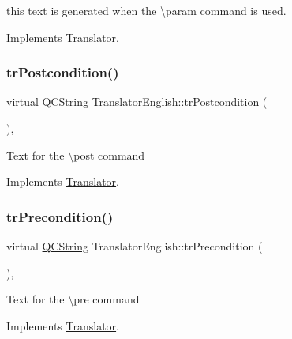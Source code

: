 this text is generated when the \textbackslash{}param command is used. 

Implements \mbox{\hyperlink{class_translator}{Translator}}.

\mbox{\label{class_translator_english_ab86ae8b2c4996172bc1138cdd0ccf7e2}} 
\subsubsection{\texorpdfstring{trPostcondition()}{trPostcondition()}}
{\footnotesize\ttfamily virtual \mbox{\hyperlink{class_q_c_string}{Q\+C\+String}} Translator\+English\+::tr\+Postcondition (\begin{DoxyParamCaption}{ }\end{DoxyParamCaption})\hspace{0.3cm}{\ttfamily [inline]}, {\ttfamily [virtual]}}

Text for the \textbackslash{}post command 

Implements \mbox{\hyperlink{class_translator}{Translator}}.

\mbox{\label{class_translator_english_a110be99e59cceffebd08b885d2cf99ba}} 
\subsubsection{\texorpdfstring{trPrecondition()}{trPrecondition()}}
{\footnotesize\ttfamily virtual \mbox{\hyperlink{class_q_c_string}{Q\+C\+String}} Translator\+English\+::tr\+Precondition (\begin{DoxyParamCaption}{ }\end{DoxyParamCaption})\hspace{0.3cm}{\ttfamily [inline]}, {\ttfamily [virtual]}}

Text for the \textbackslash{}pre command 

Implements \mbox{\hyperlink{class_translator}{Translator}}.

\mbox{\label{class_translator_english_af52cf157b7dd2e6d7f9b548bb8cf7d92}} 
